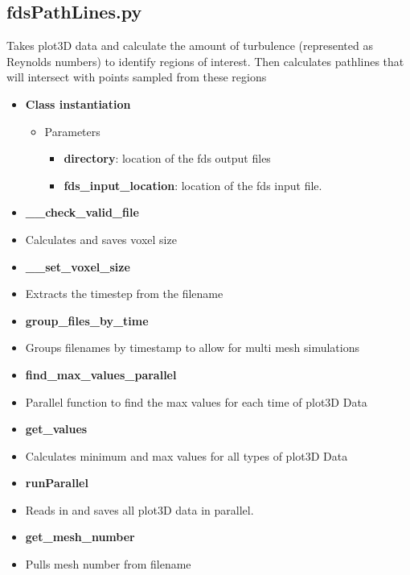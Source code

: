 \subsection{fdsPathLines.py}
\label{PythonPathLines}
Takes plot3D data and calculate the amount of turbulence (represented as Reynolds numbers) to identify regions of interest. Then calculates pathlines that will intersect with points sampled from these regions
\begin{itemize}
    \item \textbf{Class instantiation}
    \begin{itemize}    
    \item Parameters   
        \begin{itemize}
        \item\textbf{directory}: location of the fds output files
        \item\textbf{fds\_input\_location}: location of the fds input file.
        \end{itemize} 
 
    \end{itemize}   
    
    \item \textbf{\_\_check\_valid\_file}
    \item[] Calculates and saves voxel size
    
    \item \textbf{\_\_set\_voxel\_size}
    \item[] Extracts the timestep from the filename
      
    \item \textbf{group\_files\_by\_time}
    \item[]  Groups filenames by timestamp to allow for multi mesh simulations
    
    \item \textbf{find\_max\_values\_parallel}
    \item[] Parallel function to find the max values for each time of plot3D Data

    \item \textbf{get\_values}
    \item[] Calculates minimum and max values for all types of plot3D Data


    \item \textbf{runParallel}
    \item[] Reads in and saves all plot3D data in parallel.

    \item \textbf{get\_mesh\_number}
    \item[] Pulls mesh number from filename


\end{itemize}
